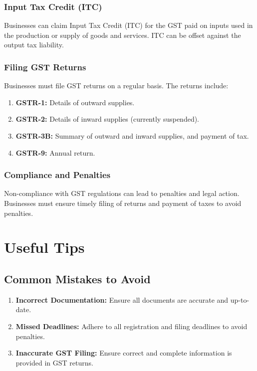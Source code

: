 \documentclass[a4paper,12pt]{report}
\begin{document}
\subsection{Input Tax Credit (ITC)}
Businesses can claim Input Tax Credit (ITC) for the GST paid on inputs used in the production or supply of goods and services. ITC can be offset against the output tax liability.

\subsection{Filing GST Returns}
Businesses must file GST returns on a regular basis. The returns include:
\begin{enumerate}
    \item \textbf{GSTR-1:} Details of outward supplies.
    \item \textbf{GSTR-2:} Details of inward supplies (currently suspended).
    \item \textbf{GSTR-3B:} Summary of outward and inward supplies, and payment of tax.
    \item \textbf{GSTR-9:} Annual return.
\end{enumerate}

\subsection{Compliance and Penalties}
Non-compliance with GST regulations can lead to penalties and legal action. Businesses must ensure timely filing of returns and payment of taxes to avoid penalties.

\chapter{Useful Tips}
\section{Common Mistakes to Avoid}
\begin{enumerate}
    \item \textbf{Incorrect Documentation:} Ensure all documents are accurate and up-to-date.
    \item \textbf{Missed Deadlines:} Adhere to all registration and filing deadlines to avoid penalties.
    \item \textbf{Inaccurate GST Filing:} Ensure correct and complete information is provided in GST returns.
\end{enumerate}
\end{document}
